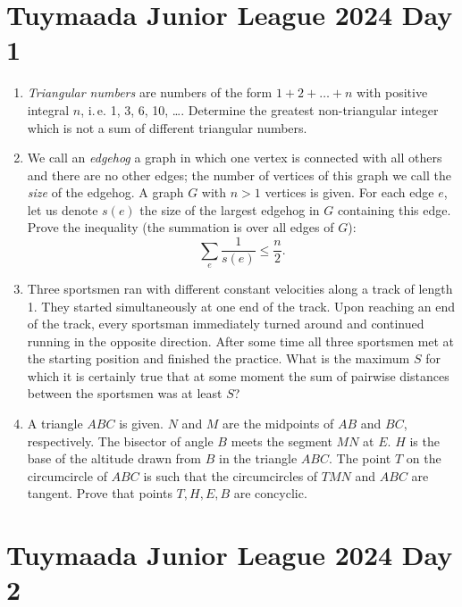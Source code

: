 \documentclass[12pt]{scrartcl}
\begin{document}
\section{Tuymaada Junior League 2024 Day 1}
\begin{enumerate}
    \item \textit{Triangular numbers} are numbers of the form $1+2+\ldots+n$ with positive integral $n$, i.\,e. 1, 3, 6, 10, \dots . Determine the greatest non-triangular integer which is not a sum of different triangular numbers. 

    \item We call an \textit{edgehog} a graph in which one vertex is connected with all others and there are no other edges; the number of vertices of this graph we call the \textit{size} of the edgehog. A graph $G$ with $n > 1$ vertices is given. For each edge $e$, let us denote $s(e)$ the size of the largest edgehog in $G$ containing this edge. Prove the inequality (the summation is over all edges of $G$):
    \[ \sum_{e} \frac{1}{s(e)} \leqslant \frac{n}{2}. \]
    

    \item Three sportsmen ran with different constant velocities along a track of length 1. They started simultaneously at one end of the track. Upon reaching an end of the track, every sportsman immediately turned around and continued running in the opposite direction. After some time all three sportsmen met at the starting position and finished the practice. What is the maximum $S$ for which it is certainly true that at some moment the sum of pairwise distances between the sportsmen was at least $S$? 

    \item A triangle $ABC$ is given. $N$ and $M$ are the midpoints of $AB$ and $BC$, respectively. The bisector of angle $B$ meets the segment $MN$ at $E$. $H$ is the base of the altitude drawn from $B$ in the triangle $ABC$. The point $T$ on the circumcircle of $ABC$ is such that the circumcircles of $TMN$ and $ABC$ are tangent. Prove that points $T, H, E, B$ are concyclic. 
\end{enumerate}

\section{Tuymaada Junior League 2024 Day 2}
\end{document}
